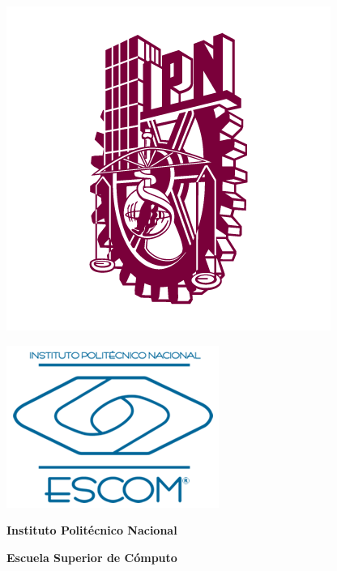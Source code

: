 \begin{titlepage}
    \centering

    \centering
    \begin{minipage}{0.4\textwidth}
        \centering
        \includegraphics[width=0.7\linewidth]{Imagenes/logo_ipn.png} 
    \end{minipage}
    \hfill
    \begin{minipage}{0.4\textwidth}
        \centering
        \includegraphics[width=0.7\linewidth]{Imagenes/logo_escom.png} 
    \end{minipage}
    
    {\fontsize{16}{18}\selectfont \textbf{Instituto Politécnico Nacional} \par}
    \vspace{0.3cm}
    {\fontsize{14}{16}\selectfont \textbf{Escuela Superior de Cómputo} \par}
    \vspace{1.5cm}


\end{titlepage}
